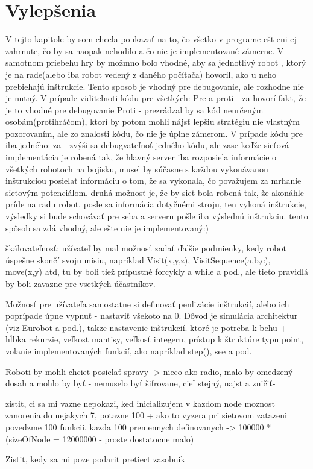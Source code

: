 \chapter{Vylepšenia}
V tejto kapitole by som chcela poukazať na to, čo všetko v programe ešt eni ej zahrnute, čo by sa naopak nehodilo a čo nie je implementované zámerne.
V samotnom priebehu hry by možmno bolo vhodné, aby sa jednotlivý robot , ktorý je na rade(alebo iba robot vedený z daného počítača) hovoril, ako u neho prebiehajú inštrukcie. Tento sposob je vhodný pre debugovanie, ale rozhodne nie je nutný.
V prípade viditelnoti kódu pre všetkých:
Pre a proti - za hovorí fakt, že je to vhodné pre debugovanie
Proti - prezrádzal by sa kód neurčeným osobám(protihráčom), ktorí by potom mohli nájsť lepšiu stratégiu nie vlastným pozorovaním, ale zo znalosti kódu, čo nie je úplne zámerom.
V prípade kódu pre iba jedného:
za - zvýši sa debugvateľnoť jedného kódu, ale zase keďže sieťová implementácia je robená tak, že hlavný server iba rozposiela informácie o všetkých robotoch na bojisku, musel by súčasne s každou vykonávanou inštrukciou posielať informáciu o tom, že sa vykonala, čo považujem za mrhanie sieťovým potenciálom. druhá možnosť je, že by sieť bola robená tak, že akonáhle príde na radu robot, posle sa informácia dotyčnémi stroju, ten vykoná inštrukcie, výsledky si bude schovávať pre seba a serveru pošle iba výslednú inštrukciu. tento spôsob sa zdá vhodný, ale ešte nie je implementovaný:)

škálovateľnosť:
užívateľ by mal možnosť zadať ďalšie podmienky, kedy robot úspešne skončí svoju misiu, napríklad Visit(x,y,z), VisitSequence(a,b,c), move(x,y) atd, tu by boli tiež prípustné forcykly  a while a pod., ale tieto pravidlá by boli zavazne pre vsetkých účastníkov.

Možnosť pre užívateľa samostatne si definovať penlizácie inštrukcií, alebo ich poprípade úpne vypnuť - nastaviť všekoto na 0. Dôvod je simulácia architektur (viz Eurobot a pod.), takze nastavenie inštrukcií. ktoré je potreba k behu + hĺbka rekurzie, veľkost mantisy, veľkosť integeru, prístup k štruktúre typu point, volanie implementovaných funkcií, ako napríklad step(), see a pod.

Roboti by mohli chciet posielať spravy -> nieco ako radio, malo by omedzený dosah a mohlo by byť - nemuselo byť šifrovane, cieľ stejný, najst a zničiť-

zistit, ci sa mi vazne nepokazi, ked inicializujem v kazdom node moznost zanorenia do nejakych 7, potazne 100 + ako to vyzera pri sietovom zatazeni
povedzme 100 funkcii, kazda 100 premennych definovanych -> 100000 * (sizeOfNode = 12000000 - proste dostatocne malo)

	Zistit, kedy sa mi poze podarit pretiect zasobnik
